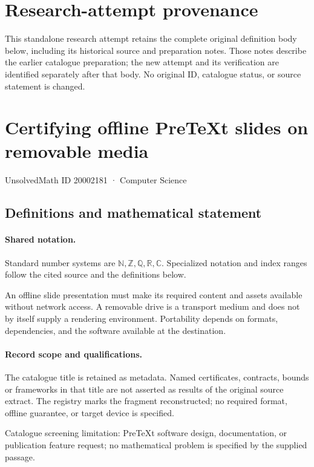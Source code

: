\documentclass[11pt]{article}
\begin{document}
\section*{Research-attempt provenance}
This standalone research attempt retains the complete original definition body below,
including its historical source and preparation notes. Those notes describe the
earlier catalogue preparation; the new attempt and its verification are identified
separately after that body. No original ID, catalogue status, or source statement is changed.

\section{Certifying offline PreTeXt slides on removable media}\label{20002181}
{\small UnsolvedMath ID 20002181 · Computer Science}
\subsection{Definitions and mathematical statement}

\paragraph{Shared notation.}Standard number systems are $\mathbb N,\mathbb Z,\mathbb Q,\mathbb R,\mathbb C$. Specialized notation and index ranges follow the cited source and the definitions below.


An offline slide presentation must make its required content and assets available without network access. A removable drive is a transport medium and does not by itself supply a rendering environment. Portability depends on formats, dependencies, and the software available at the destination.
\paragraph{Record scope and qualifications.}
The catalogue title is retained as metadata. Named certificates, contracts, bounds or frameworks in that title are not asserted as results of the original source extract.
The registry marks the fragment reconstructed; no required format, offline guarantee, or target device is specified.

Catalogue screening limitation: PreTeXt software design, documentation, or publication feature request; no mathematical problem is specified by the supplied passage.
\end{document}
